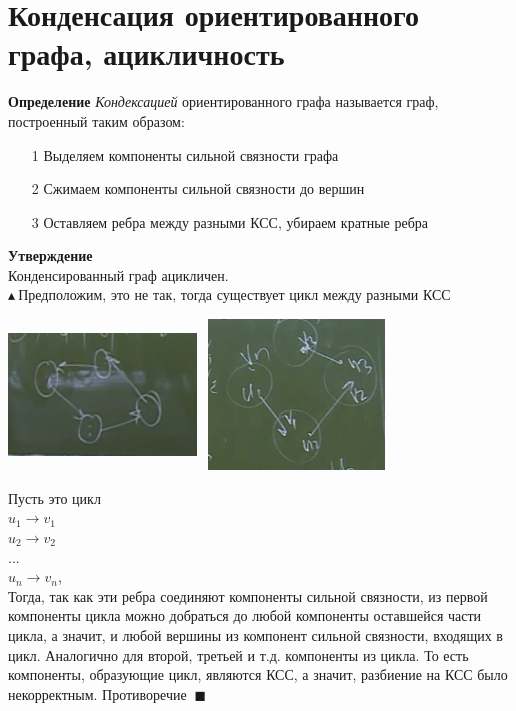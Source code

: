 \setcounter{section}{31}
\section{Конденсация ориентированного графа, ацикличность}
\textbf{Определение} \textit{Кондексацией} ориентированного графа называется граф, построенный таким образом:
\begin{itemize}
    \item [1] Выделяем компоненты сильной связности графа
    \item[2] Сжимаем компоненты сильной связности до вершин
    \item[3] Оставляем ребра между разными КСС, убираем кратные ребра
\end{itemize}
\textbf{Утверждение}\\
Конденсированный граф ацикличен. 
\\
$\blacktriangle \ $Предположим, это не так, тогда существует цикл между разными КСС
\begin{center}
    \includegraphics[width=5cm,height=4cm]{images/32_alg13.PNG}
    \includegraphics[width=5cm,height=4cm]{images/32_alg14.PNG}
\end{center}
Пусть это цикл 
\\
$u_1 \rightarrow v_1$ \\ $u_2 \rightarrow v_2$ \\ ... \\ $u_n \rightarrow v_n$, \\Тогда, так как эти ребра соединяют компоненты сильной связности, из первой компоненты цикла можно добраться до любой компоненты оставшейся части цикла, а значит, и любой вершины из компонент сильной связности, входящих в цикл. Аналогично для второй, третьей и т.д. компоненты из цикла. То есть компоненты, образующие цикл, являются КСС, а значит, разбиение на КСС было некорректным. Противоречие $\ \blacksquare$